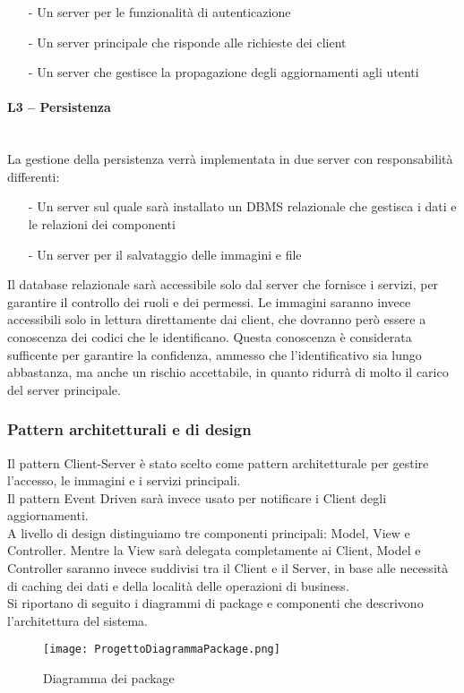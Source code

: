 \begin{itemize}
    \item[-] Un server per le funzionalità di autenticazione
    \item[-] Un server principale che risponde alle richieste dei client
    \item[-] Un server che gestisce la propagazione degli aggiornamenti agli utenti
\end{itemize}

\paragraph{L3 -- Persistenza}\mbox{}\\
La gestione della persistenza verrà implementata in due server con responsabilità differenti:
\begin{itemize}
    \item[-] Un server sul quale sarà installato un DBMS relazionale che gestisca i dati e le relazioni dei componenti
    \item[-] Un server per il salvataggio delle immagini e file
\end{itemize}

Il database relazionale sarà accessibile solo dal server che fornisce i servizi, per garantire il controllo dei ruoli e dei permessi.
Le immagini saranno invece accessibili solo in lettura direttamente dai client, che dovranno però essere a conoscenza dei codici che le identificano.
Questa conoscenza è considerata sufficente per garantire la confidenza, ammesso che l'identificativo sia lungo abbastanza,
ma anche un rischio accettabile, in quanto ridurrà di molto il carico del server principale.

\subsubsection{Pattern architetturali e di design}

Il pattern Client-Server è stato scelto come pattern architetturale per gestire l'accesso, le immagini e i servizi principali.\\
Il pattern Event Driven sarà invece usato per notificare i Client degli aggiornamenti.\\
A livello di design distinguiamo tre componenti principali: Model, View e Controller.
Mentre la View sarà delegata completamente ai Client, Model e Controller saranno invece suddivisi tra il Client e il Server,
in base alle necessità di caching dei dati e della località delle operazioni di business.\\
Si riportano di seguito i diagrammi di package e componenti che descrivono l'architettura del sistema.\\
\newpage
\begin{figure}[h!]
    \begin{center}
        \texttt{[image: ProgettoDiagrammaPackage.png]}
        \caption{Diagramma dei package}
    \end{center}
\end{figure}

